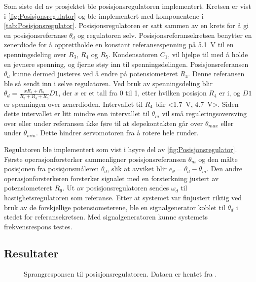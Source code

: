 Som siste del av prosjektet ble posisjonsregulatoren implementert. Kretsen er vist i \autoref{fig:Posisjonsregulator} og ble implementert med komponentene i \autoref{tab:Posisjonsregulator}. Posisjonsregulatoren er satt sammen av en krets for å gi en posisjonsreferanse $\theta_d$ og regulatoren selv.
Posisjonsreferansekretsen benytter en zenerdiode for å opprettholde en konstant referansespenning på {\SI{5.1}{\volt}} til en spenningsdeling over $R_3$, $R_4$ og $R_5$. 
Kondensatoren $C_1$, vil hjelpe til med å holde en jevnere spenning, og fjerne støy inn til spenningsdelingen. 
Posisjonsreferansen $\theta_d$ kunne dermed justeres ved å endre på potensiometeret $R_4$. Denne referansen ble så sendt inn i selve regulatoren. 
Ved bruk av spenningsdeling blir $\theta_d = \frac{x R_4 + R_5}{R_3 + R_4 + R_5} D1$, der $x$ er et tall fra 0 til 1, etter hvilken posisjon $R_4$ er i, og $D1$ er spenningen over zenerdioden. 
Intervallet til $R_4$ blir <\SI{1.7}{\volt}, \SI{4.7}{\volt}>. 
Siden dette intervallet er litt mindre enn intervallet til $\theta_m$ vil små reguleringsoversving over eller under referansen ikke føre til at slepekontakten går over $\theta_{max}$ eller under $\theta_{min}$. Dette hindrer servomotoren fra å rotere hele runder.

Regulatoren ble implementert som vist i høyre del av \autoref{fig:Posisjonsregulator}. Første operasjonforsterker sammenligner posisjonsreferansen $\theta_m$ og den målte posisjonen fra posisjonsmåleren $\theta_d$, slik at avviket blir $e_{\theta} = \theta_d - \theta_m$. Den andre operasjonforsterkeren forsterker signalet med en forsterkning justert av potensiometeret $R_9$. Ut av posisjonsregulatoren sendes $\omega_d$ til hastighetsregulatoren som referanse.
Etter at systemet var finjustert riktig ved bruk av de forskjellige potensiometerene, ble en signalgenerator koblet til $\theta_d$ i stedet for referansekretsen. Med signalgeneratoren kunne systemets frekvensrespons testes.






\subsection{Resultater}


\begin{figure}[h!]
    \centering
    
    \caption{Sprangresponsen til posisjonsregulatoren. Dataen er hentet fra \cite{EksempelData}.}
    \label{fig:posisjon_P_regulator}
\end{figure}

